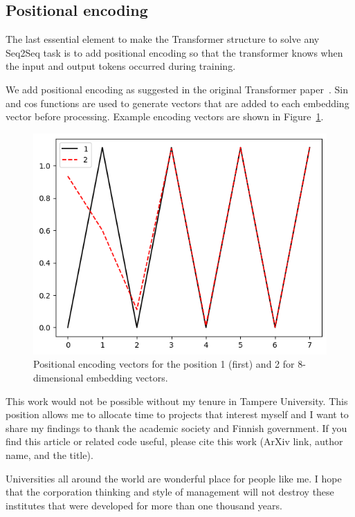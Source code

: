 \documentclass[final]{article}
\begin{document}
\subsection{Positional encoding}
The last essential element to make the Transformer structure to solve any Seq2Seq task is to add positional encoding so that the transformer knows when the input and output tokens occurred during training.

We add positional encoding as suggested in the original Transformer paper~\cite{transformer}. Sin and cos functions are used to generate vectors that are added to each embedding vector before processing. Example encoding vectors are shown in Figure~\ref{fig:posencoding}.

\begin{figure}[h]
  \begin{center}
  \includegraphics[width=0.5\linewidth]{posencoding.png}
  \caption{Positional encoding vectors for the position 1 (first) and 2 for 8-dimensional embedding vectors.}
  \label{fig:posencoding}
  \end{center}
\end{figure}


\begin{ack}
This work would not be possible without my tenure in Tampere
University. This position allows me to allocate time to projects
that interest myself and I want to share my findings to thank the
academic society and Finnish government. If you find this article or
related code useful, please cite this work (ArXiv link, author name,
and the title).

Universities all around the world are wonderful place for people like
me. I hope that the corporation thinking and style of management will
not destroy these institutes that were developed for more than one
thousand years.
\end{ack}

\printbibliography
\end{document}
